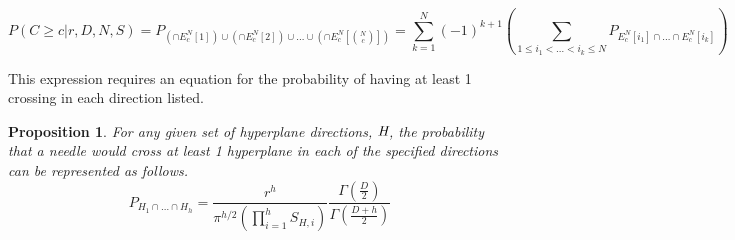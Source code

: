 \documentclass{article}
\newtheorem{proposition}{Proposition}
\begin{document}
\begin{equation}
	P(C\ge c|r, D, N, S) = P_{(\cap E_c^N[1])\cup(\cap E_c^N[2])\cup\hdots\cup(\cap E_c^N[{N \choose c}])} = \sum_{k=1}^N (-1)^{k+1}\left(\sum_{1\le i_1 < \hdots < i_k \le N}P_{E_c^N[i_1] \cap \hdots \cap E_c^N[i_k]} \right)
\end{equation}

This expression requires an equation for the probability of having at least 1 crossing in
each direction listed. 

\begin{proposition}
	For any given set of hyperplane directions, $\emph{H}$, the probability that a needle would cross
	at least 1 hyperplane in each of the specified directions can be represented as follows.
	\begin{equation}
		P_{H_1 \cap \hdots \cap H_h} = \frac{r^h }{ \pi^{h/2} (\prod_{i=1}^h S_{H,i}) }\frac{\Gamma(\frac{D}{2})}{\Gamma(\frac{D+h}{2})}
	\end{equation}
\end{proposition}
\end{document}
